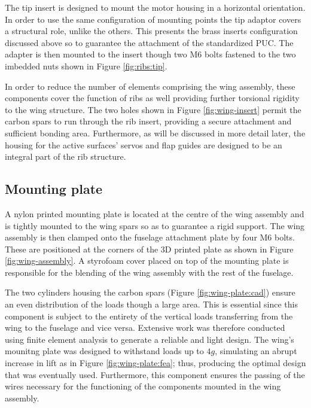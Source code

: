 \documentclass[../../main.tex]{subfiles}
\begin{document}

The tip insert is designed to mount the motor housing in a horizontal orientation.
In order to use the same configuration of mounting points the tip adaptor covers a structural role, unlike the others.
This presents the brass inserts configuration discussed above so to guarantee the attachment of the standardized PUC.  %
The adapter is then mounted to the insert though two M6 bolts fastened to the two imbedded nuts shown in Figure \ref{fig:ribs:tip}. 

In order to reduce the number of elements comprising the wing assembly, these components cover the function of ribs as well providing further torsional rigidity to the wing structure.
The two holes shown in Figure \ref{fig:wing-insert} permit the carbon spars to run through the rib insert, providing a secure attachment and sufficient bonding area.
Furthermore, as will be discussed in more detail later, the housing for the active surfaces' servos and flap guides are designed to be an integral part of the rib structure. 

\subsection{Mounting plate} \label{sec:final-design-proposal:wing:mounting-plate}

A nylon printed mounting plate is located at the centre of the wing assembly and is tightly mounted to the wing spars so as to guarantee a rigid support.
The wing assembly is then clamped onto the fuselage attachment plate by four M6 bolts.
These are positioned at the corners of the 3D printed plate as shown in Figure \ref{fig:wing-assembly}.
A styrofoam cover placed on top of the mounting plate is responsible for the blending of the wing assembly with the rest of the fuselage.


The two cylinders housing the carbon spars (Figure \ref{fig:wing-plate:cad}) ensure an even distribution of the loads though a large area.
This is essential since this component is subject to the entirety of the vertical loads transferring from the wing to the fuselage and vice versa.
Extensive work was therefore conducted using finite element analysis to generate a reliable and light design.
The wing's mounitng plate was designed to withstand loads up to $4g$, simulating an abrupt increase in lift as in Figure \ref{fig:wing-plate:fea}; thus, producing the optimal design that was eventually used.
Furthermore, this component ensures the passing of the wires necessary for the functioning of the components mounted in the wing assembly.
\end{document}
